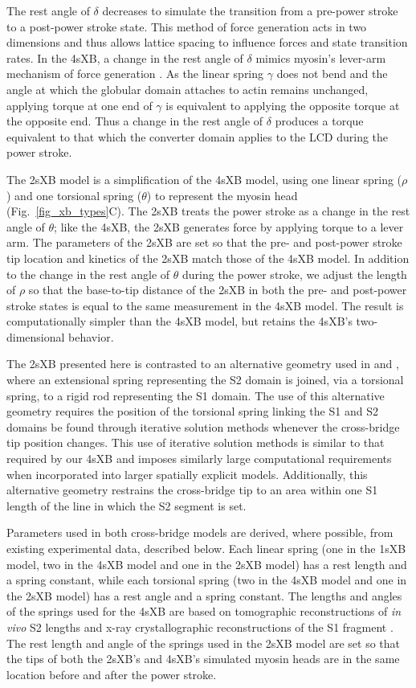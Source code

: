\documentclass[10pt]{article}
\newcommand{\citep}[1]{\cite{#1}} %
\newcommand{\citet}[1]{\cite{#1}}
\begin{document}
The rest angle of $\delta$ decreases to simulate the transition from a pre-power stroke to a post-power stroke state.
This method of force generation acts in two dimensions and thus allows lattice spacing to influence forces and state transition rates. 
In the 4sXB, a change in the rest angle of $\delta$ mimics myosin's lever-arm mechanism of force generation \citep{Houdusse2000, Houdusse2001}. 
As the linear spring $\gamma$ does not bend and the angle at which the globular domain attaches to actin remains unchanged, applying torque at one end of $\gamma$ is equivalent to applying the opposite torque at the opposite end.
Thus a change in the rest angle of $\delta$ produces a torque equivalent to that which the converter domain applies to the LCD during the power stroke.

The 2sXB model is a simplification of the 4sXB model, using one linear spring ($\rho$) and one torsional spring ($\theta$) to represent the myosin head (Fig.~\ref{fig_xb_types}C).
The 2sXB treats the power stroke as a change in the rest angle of $\theta$; like the 4sXB, the 2sXB generates force by applying torque to a lever arm.
The parameters of the 2sXB are set so that the pre- and post-power stroke tip location and kinetics of the 2sXB match those of the 4sXB model. 
In addition to the change in the rest angle of $\theta$ during the power stroke, we adjust the length of $\rho$ so that the base-to-tip distance of the 2sXB in both the pre- and post-power stroke states is equal to the same measurement in the 4sXB model.
The result is computationally simpler than the 4sXB model, but retains the 4sXB's two-dimensional behavior.

The 2sXB presented here is contrasted to an alternative geometry used in \citet{Schoenberg1980a} and \citet{Schoenberg1980b}, where an extensional spring representing the S2 domain is joined, via a torsional spring, to a rigid rod representing the S1 domain.
The use of this alternative geometry requires the position of the torsional spring linking the S1 and S2 domains be found through iterative solution methods whenever the cross-bridge tip position changes. 
This use of iterative solution methods is similar to that required by our 4sXB and imposes similarly large computational requirements when incorporated into larger spatially explicit models. 
Additionally, this alternative geometry restrains the cross-bridge tip to an area within one S1 length of the line in which the S2 segment is set.

Parameters used in both cross-bridge models are derived, where possible, from existing experimental data, described below.  
Each linear spring (one in the 1sXB model, two in the 4sXB model and one in the 2sXB model) has a rest length and a spring constant, while each torsional spring (two in the 4sXB model and one in the 2sXB model) has a rest angle and a spring constant. 
The lengths and angles of the springs used for the 4sXB are based on tomographic reconstructions of \emph{in vivo} S2 lengths and x-ray crystallographic reconstructions of the S1 fragment \citep{Taylor1999, Rayment1993}.
The rest length and angle of the springs used in the 2sXB model are set so that the tips of both the 2sXB's and 4sXB's simulated myosin heads are in the same location before and after the power stroke.
\end{document}

